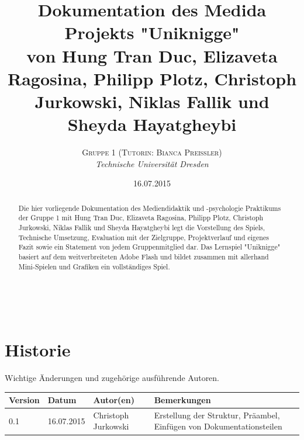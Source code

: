 \documentclass[a4paper, 11pt]{article} %
\title{\textbf{Dokumentation des Medida Projekts "Uniknigge"}\\ %
von Hung Tran Duc, Elizaveta Ragosina, Philipp Plotz, Christoph Jurkowski, Niklas Fallik und Sheyda Hayatgheybi} %
\author{\textsc{Gruppe 1 (Tutorin: Bianca Preißler)} %
\\{\textit{Technische Universität Dresden}}} %
\date{16.07.2015} %
\makeatletter
\renewcommand{\maketitle}{ %
\begin{flushright} %
{\LARGE\@title} %

\vspace{50pt} %

{\large\@author} %
\\\@date %

\vspace{40pt} %
\end{flushright}
}
\makeatother
\begin{document}
\maketitle %


\renewcommand{\abstractname}{Präambel} %

\vspace{5cm} %


\begin{abstract}
\noindent
Die hier vorliegende Dokumentation des Mediendidaktik und -psychologie Praktikums der Gruppe 1 mit Hung Tran Duc, Elizaveta Ragosina, Philipp Plotz, Christoph Jurkowski, Niklas Fallik und Sheyda Hayatgheybi legt die Vorstellung des Spiels, Technische Umsetzung, Evaluation mit der Zielgruppe, Projektverlauf
und eigenes Fazit sowie ein Statement von jedem Gruppenmitglied dar. Das Lernspiel "Uniknigge" basiert auf dem weitverbreiteten Adobe Flash und bildet zusammen mit allerhand Mini-Spielen und Grafiken ein vollständiges Spiel.
\end{abstract}


\newpage 
\section*{Historie}
Wichtige Änderungen und zugehörige ausführende Autoren.\\
\begin{tabular}{|lllp{5.5cm}|}
\hline 
\textbf{Version} & \textbf{Datum} & \textbf{Autor(en)} & \textbf{Bemerkungen} \\ 
\hline 
0.1 & 16.07.2015 & Christoph Jurkowski & \nohyphens{Erstellung der Struktur, Präambel, Einfügen von Dokumentationsteilen} \\ 
\hline
\end{tabular} 


\end{document}
